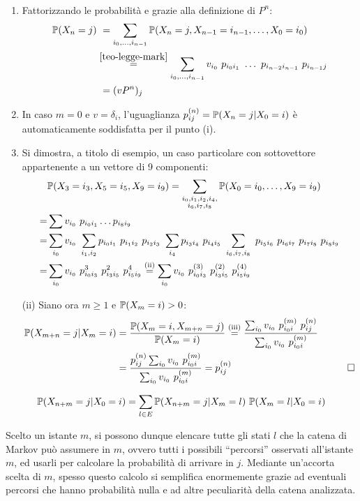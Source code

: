 \begin{dimo}~
	\begin{enumerate}[label=(\roman*)]
		\item Fattorizzando le probabilità e grazie alla definizione di $P^n$:
	 	\begin{align*}
			\mathbb P(X_n = j) &\ = \sum_{i_0,\dots,i_{n-1}} \mathbb P(X_n=j, X_{n-1}=i_{n-1},\dots,X_0=i_0) \\
			&\stackrel{\ref{teo-legge-mark}}{=} \sum_{i_0,\dots,i_{n-1}} v_{i_0} \ p_{i_0 i_1} \ \dots \ p_{i_{n-2} i_{n-1}} \ p_{i_{n-1} j} \\
			&\ = (v P^n)_j
		\end{align*}
		\item In caso $m=0$ e $v=\delta_i$, l'uguaglianza $p_{ij}^{(n)} = \mathbb P(X_n=j | X_0=i)$ è
			automaticamente soddisfatta per il punto (i).
		\item Si dimostra, a titolo di esempio, un caso particolare con sottovettore appartenente a un vettore di 9 componenti:
		\begin{align*}
			&\PP(X_3=i_3, X_5=i_5, X_9=i_9) =
			\sum_{\substack{i_0,i_1,i_2,i_4,\\i_6,i_7,i_8}} \PP(X_0=i_0,\dots,X_9=i_9) \\
			= &\sum v_{i_0} \ p_{i_0 i_1} \dots p_{i_8 i_9} \\
			= &\sum_{i_0} v_{i_0} \ \sum_{i_1,i_2} p_{i_0 i_1} \ p_{i_1 i_2} \ p_{i_2 i_3}
			\ \sum_{i_4} p_{i_3 i_4} \ p_{i_4 i_5} \ \sum_{i_6,i_7,i_8} \ p_{i_5 i_6} \ p_{i_6 i_7} \ p_{i_7 i_8} \ p_{i_8 i_9} \\
			= &\sum_{i_0} v_{i_0} \ p_{i_0 i_3}^3 \ p_{i_3 i_5}^2 \ p_{i_5 i_9}^4
			\stackrel{\text{(ii)}}{=} \sum_{i_0} v_{i_0} \ p_{i_0 i_3}^{(3)} \ p_{i_3 i_5}^{(2)} \ p_{i_5 i_9}^{(4)}
		\end{align*}
	\item[(ii)] Siano ora $m \ge 1$ e $\mathbb P(X_m=i)>0$:
	\begin{align*}
		\PP(X_{m+n}=j | X_m=i) &= \frac{\PP(X_m=i, X_{m+n}=j)}{\PP(X_m=i)} \stackrel{\text{(iii)}}{=}
		\frac{\sum_{i_0} v_{i_0} \ p_{i_0 i}^{(m)} \ p_{ij}^{(n)}}{\sum_{i_0} v_{i_0} \ p_{i_0 i}^{(m)}} \\
		&= \frac{p_{ij}^{(n)} \sum_{i_0} v_{i_0} \ p_{i_0 i}^{(m)}}{\sum_{i_0} v_{i_0} \ p_{i_0 i}^{(m)}} =
		p_{ij}^{(n)}&\qedhere
	\end{align*}
	\end{enumerate}
\end{dimo}


\begin{teo}
	$$\mathbb P(X_{n+m}=j | X_0=i) = \sum_{l \in E} \mathbb P(X_{n+m}=j | X_m=l) \ \mathbb P(X_m=l | X_0=i)$$
\end{teo}
Scelto un istante $m$, si possono dunque elencare tutte gli stati $l$ che la catena di Markov può assumere in $m$, ovvero tutti i possibili ``percorsi'' osservati all'istante $m$, ed usarli per calcolare la probabilità di arrivare in $j$.
Mediante un'accorta scelta di $m$, spesso questo calcolo si semplifica enormemente grazie ad eventuali percorsi che hanno probabilità nulla e ad altre peculiarità della catena analizzata.

